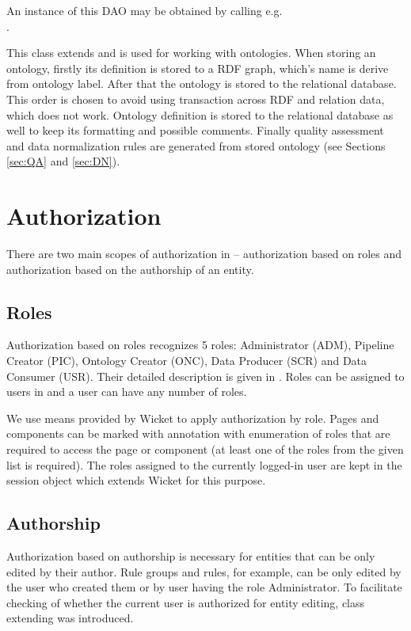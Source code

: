 \begin{description}[style=nextline,font=\ttfamily]
		An instance of this DAO may be obtained by calling e.g.\\
		.
	\item[OntologyDao] This class extends  and is used for working with ontologies. When storing an ontology, firstly its definition is stored to a RDF graph, which's name is derive from ontology label. After that the ontology is stored to the relational database. This order is chosen to avoid using transaction across RDF and relation data, which does not work. Ontology definition is stored to the relational database as well to keep its formatting and possible comments. Finally quality assessment and data normalization rules are generated from stored ontology (see Sections \ref{sec:QA} and \ref{sec:DN}).
\end{description}

\section{Authorization}
There are two main scopes of authorization in \odcs -- authorization based on roles and authorization based on the authorship of an entity.

\subsection{Roles}
Authorization based on roles recognizes 5 roles: Administrator (ADM), Pipeline Creator (PIC), Ontology Creator (ONC), Data Producer (SCR) and Data Consumer (USR). Their detailed description is given in . Roles can be assigned to users in \FE and a user can have any number of roles.

We use means provided by Wicket to apply authorization by role. Pages and components can be marked with  annotation with enumeration of roles that are required to access the page or component (at least one of the roles from the given list is required). The roles assigned to the currently logged-in user are kept in the session object  which extends Wicket  for this purpose.

\subsection{Authorship}
\label{sec:authorshipAuth}
Authorization based on authorship is necessary for entities that can be only edited by their author. Rule groups and rules, for example, can be only edited by the user who created them or by user having the role Administrator. To facilitate checking of whether the current user is authorized for entity editing, class  extending  was introduced.

